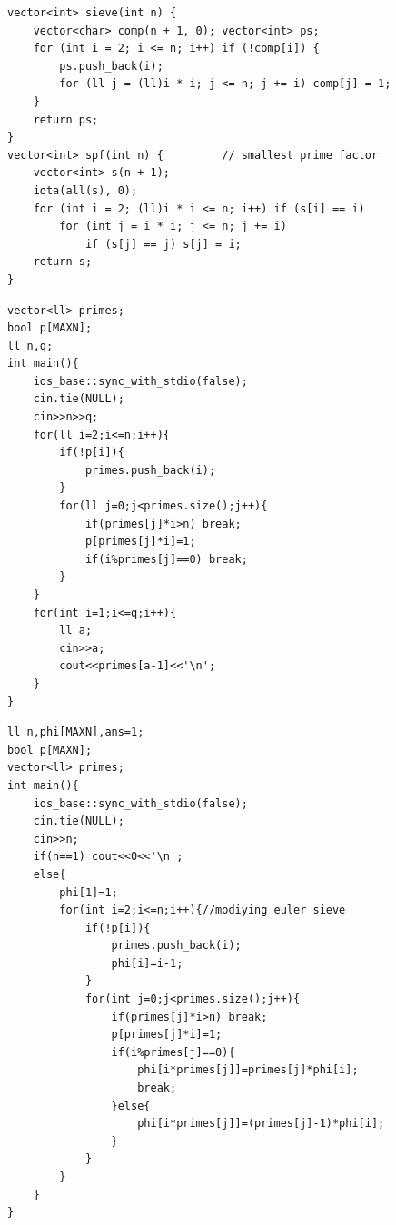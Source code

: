 \begin{lstlisting}
vector<int> sieve(int n) {
    vector<char> comp(n + 1, 0); vector<int> ps;
    for (int i = 2; i <= n; i++) if (!comp[i]) {
        ps.push_back(i);
        for (ll j = (ll)i * i; j <= n; j += i) comp[j] = 1;
    }
    return ps;
}
vector<int> spf(int n) {         // smallest prime factor
    vector<int> s(n + 1);
    iota(all(s), 0);
    for (int i = 2; (ll)i * i <= n; i++) if (s[i] == i)
        for (int j = i * i; j <= n; j += i)
            if (s[j] == j) s[j] = i;
    return s;
}
\end{lstlisting}


\begin{lstlisting}
vector<ll> primes;
bool p[MAXN];
ll n,q;
int main(){
    ios_base::sync_with_stdio(false);
    cin.tie(NULL);
    cin>>n>>q;
    for(ll i=2;i<=n;i++){
        if(!p[i]){
            primes.push_back(i);
        }
        for(ll j=0;j<primes.size();j++){
            if(primes[j]*i>n) break;
            p[primes[j]*i]=1;
            if(i%primes[j]==0) break;
        }
    }
    for(int i=1;i<=q;i++){
        ll a;
        cin>>a;
        cout<<primes[a-1]<<'\n';
    }
}
\end{lstlisting}


\begin{lstlisting}
ll n,phi[MAXN],ans=1;
bool p[MAXN];
vector<ll> primes;
int main(){
    ios_base::sync_with_stdio(false);
    cin.tie(NULL);
    cin>>n;
    if(n==1) cout<<0<<'\n';
    else{
        phi[1]=1;
        for(int i=2;i<=n;i++){//modiying euler sieve
            if(!p[i]){
                primes.push_back(i);
                phi[i]=i-1;
            }
            for(int j=0;j<primes.size();j++){
                if(primes[j]*i>n) break;
                p[primes[j]*i]=1;
                if(i%primes[j]==0){
                    phi[i*primes[j]]=primes[j]*phi[i];
                    break;
                }else{
                    phi[i*primes[j]]=(primes[j]-1)*phi[i];
                }
            }
        }
    }
}
\end{lstlisting}

